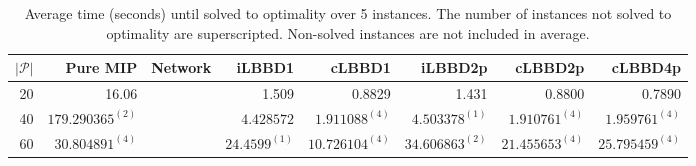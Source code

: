\begin{table*}
    \centering
    \caption{Average time (seconds) until solved to optimality over 5 instances. The number of instances not solved to optimality are superscripted. Non-solved instances are not included in average.}
    \begin{tabular}{rrrrrrrr} \toprule
        $|\mathcal{P}|$ & Pure MIP & Network & iLBBD1 & cLBBD1 & iLBBD2p & cLBBD2p & cLBBD4p \\ \midrule
        20              & 16.06 &         & 1.509 &  0.8829 & 1.431 & 0.8800 & 0.7890 \\
        40              & $179.290365^{(2)}$ &    &  $4.428572$ & $1.911088^{(4)}$ & $4.503378^{(1)}$ & $1.910761^{(4)}$ & $1.959761^{(4)}$ \\
        60 & $30.804891^{(4)}$ &  & $24.4599^{(1)}$ & $10.726104^{(4)}$ & $34.606863^{(2)}$ & $21.455653^{(4)}$ & $25.795459^{(4)}$ \\
        \bottomrule
    \end{tabular}
\end{table*}
